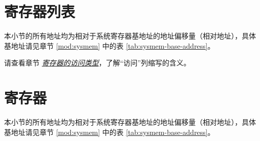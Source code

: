 \documentclass[main\_\_CN.tex]{subfiles}
\begin{document}


\clearpage
\begin{landscape}
\hypertarget{sysreg-reg-summ}{}
\section{寄存器列表}
\label{sec:sysreg-reg-summ}

本小节的所有地址均为相对于系统寄存器基地址的地址偏移量（相对地址），具体基地址请见章节 \ref{mod:sysmem} \textit{} 中的表 \ref{tab:sysmem-base-address}。

请查看章节 \hyperref[glossary-access-types]{\textit{寄存器的访问类型}}，了解“访问”列缩写的含义。


\end{landscape}



\clearpage
\section{寄存器}

本小节的所有地址均为相对于系统寄存器基地址的地址偏移量（相对地址），具体基地址请见章节 \ref{mod:sysmem} \textit{} 中的表 \ref{tab:sysmem-base-address}。


\end{document}
